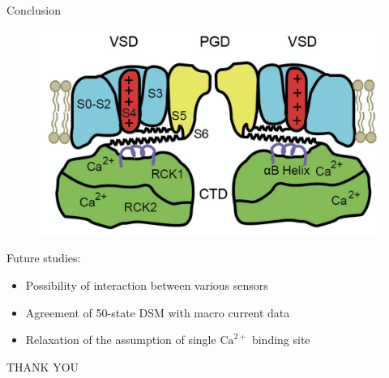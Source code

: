 \documentclass{beamer}
\newcommand{\ca}{\text{Ca}^{2+}}
\begin{document}
\begin{frame}{Conclusion}
\begin{figure}
\centering
\includegraphics[width=.5\textwidth]{BK_Cartoon.png}
\end{figure}

Future studies:
\begin{itemize}
	\item Possibility of interaction between various sensors
	\item Agreement of 50-state DSM with macro current data
	\item Relaxation of the assumption of single $\ca$ binding site
\end{itemize}

\end{frame}

\begin{frame}
\begin{center}
\huge{THANK YOU}
\end{center}
\end{frame}

\end{document}
